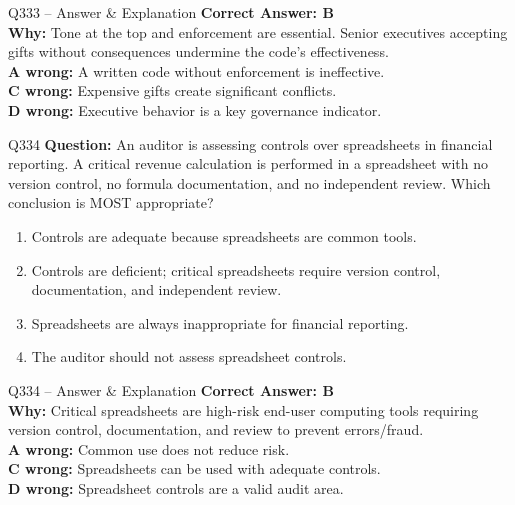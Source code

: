 \documentclass[aspectratio=169,10pt]{beamer}
\begin{document}
	\begin{frame}[t]{Q333 -- Answer \& Explanation}
		\small
		\textbf{Correct Answer: B} \\[4pt]
		\textbf{Why:} Tone at the top and enforcement are essential. Senior executives accepting gifts without consequences undermine the code's effectiveness. \\[4pt]
		\textbf{A wrong:} A written code without enforcement is ineffective. \\[2pt]
		\textbf{C wrong:} Expensive gifts create significant conflicts. \\[2pt]
		\textbf{D wrong:} Executive behavior is a key governance indicator.
	\end{frame}
	
	\begin{frame}[t]{Q334}
		\small
		\textbf{Question:} An auditor is assessing controls over spreadsheets in financial reporting. A critical revenue calculation is performed in a spreadsheet with no version control, no formula documentation, and no independent review. Which conclusion is MOST appropriate?
		\begin{enumerate}[label=\Alph*.,itemsep=1pt,topsep=2pt]
			\item Controls are adequate because spreadsheets are common tools.
			\item Controls are deficient; critical spreadsheets require version control, documentation, and independent review.
			\item Spreadsheets are always inappropriate for financial reporting.
			\item The auditor should not assess spreadsheet controls.
		\end{enumerate}
	\end{frame}
	
	\begin{frame}[t]{Q334 -- Answer \& Explanation}
		\small
		\textbf{Correct Answer: B} \\[4pt]
		\textbf{Why:} Critical spreadsheets are high-risk end-user computing tools requiring version control, documentation, and review to prevent errors/fraud. \\[4pt]
		\textbf{A wrong:} Common use does not reduce risk. \\[2pt]
		\textbf{C wrong:} Spreadsheets can be used with adequate controls. \\[2pt]
		\textbf{D wrong:} Spreadsheet controls are a valid audit area.
	\end{frame}
	
\end{document}
